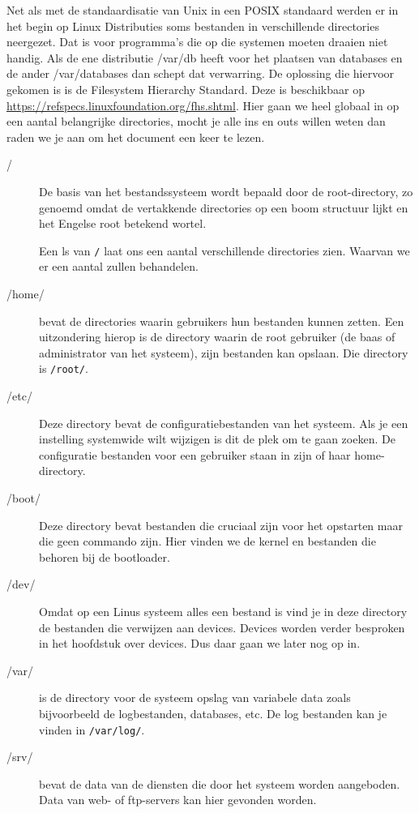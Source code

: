 Net als met de standaardisatie van Unix in een POSIX standaard werden er in het begin op Linux Distributies soms bestanden in verschillende directories neergezet. Dat is voor programma's die op die systemen moeten draaien niet handig. Als de ene distributie /var/db heeft voor het plaatsen van databases en de ander /var/databases dan schept dat verwarring. De oplossing die hiervoor gekomen is is de Filesystem Hierarchy Standard. Deze is beschikbaar op \url{https://refspecs.linuxfoundation.org/fhs.shtml}. Hier gaan we heel globaal in op een aantal belangrijke directories, mocht je alle ins en outs willen weten dan raden we je aan om het document een keer te lezen.

\begin{description}
\item [/] De basis van het bestandssysteem wordt bepaald door de root-directory, zo genoemd omdat de vertakkende directories op een boom structuur lijkt en het Engelse root betekend wortel.

Een ls van \texttt{/} laat ons een aantal verschillende directories zien. Waarvan we er een aantal zullen behandelen.

\item [/home/] bevat de directories waarin gebruikers hun bestanden kunnen zetten. Een uitzondering hierop is de directory waarin de root gebruiker (de baas of administrator van het systeem), zijn bestanden kan opslaan. Die directory is \texttt{/root/}.

\item [/etc/] Deze directory bevat de configuratiebestanden van het systeem. Als je een instelling systemwide wilt wijzigen is dit de plek om te gaan zoeken. De configuratie bestanden voor een gebruiker staan in zijn of haar home-directory.

\item [/boot/] Deze directory bevat bestanden die cruciaal zijn voor het opstarten maar die geen commando zijn. Hier vinden we de kernel en bestanden die behoren bij de bootloader.

\item [/dev/] Omdat op een Linus systeem alles een bestand is vind je in deze directory de bestanden die verwijzen aan devices. Devices worden verder besproken in het hoofdstuk over devices. Dus daar gaan we later nog op in.

\item [/var/] is de directory voor de systeem opslag van variabele data zoals bijvoorbeeld de logbestanden, databases, etc. De log bestanden kan je vinden in \texttt{/var/log/}.

\item [/srv/] bevat de data van de diensten die door het systeem worden aangeboden. Data van web- of ftp-servers kan hier gevonden worden.
\end{description}
